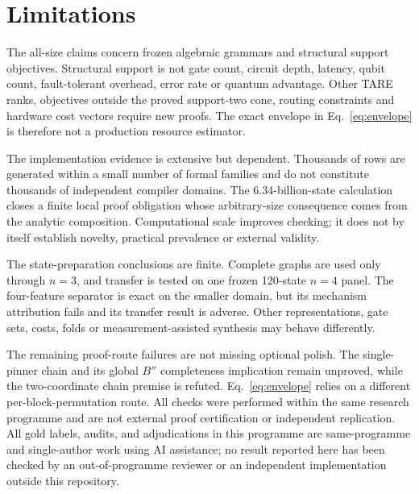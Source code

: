 \section{Limitations}

The all-size claims concern frozen algebraic grammars and structural support objectives.  Structural support is not gate count, circuit depth, latency, qubit count, fault-tolerant overhead, error rate or quantum advantage.  Other TARE ranks, objectives outside the proved support-two cone, routing constraints and hardware cost vectors require new proofs.  The exact envelope in Eq.~\eqref{eq:envelope} is therefore not a production resource estimator.

The implementation evidence is extensive but dependent.  Thousands of rows are generated within a small number of formal families and do not constitute thousands of independent compiler domains.  The 6.34-billion-state calculation closes a finite local proof obligation whose arbitrary-size consequence comes from the analytic composition.  Computational scale improves checking; it does not by itself establish novelty, practical prevalence or external validity.

The state-preparation conclusions are finite.  Complete graphs are used only through $n=3$, and transfer is tested on one frozen 120-state $n=4$ panel.  The four-feature separator is exact on the smaller domain, but its mechanism attribution fails and its transfer result is adverse.  Other representations, gate sets, costs, folds or measurement-assisted synthesis may behave differently.

The remaining proof-route failures are not missing optional polish.  The single-pinner chain and its global $B''$ completeness implication remain unproved, while the two-coordinate chain premise is refuted.  Eq.~\eqref{eq:envelope} relies on a different per-block-permutation route.  All checks were performed within the same research programme and are not external proof certification or independent replication.  All gold labels, audits, and adjudications in this programme are same-programme and single-author work using AI assistance; no result reported here has been checked by an out-of-programme reviewer or an independent implementation outside this repository.
